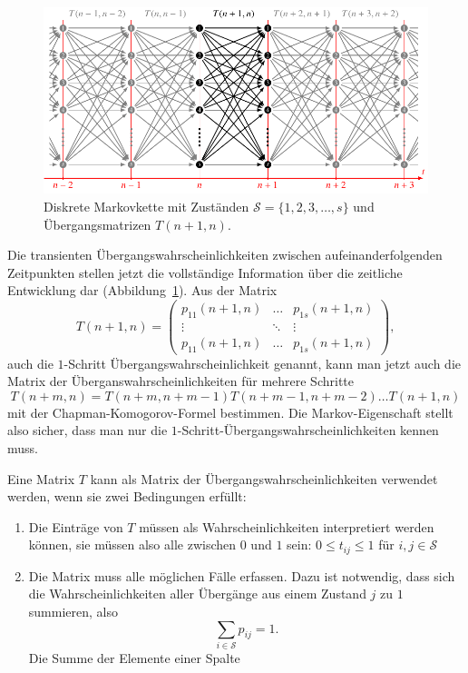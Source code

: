 \begin{figure}
\centering
\includegraphics{chapters/80-wahrscheinlichkeit/images/markov.pdf}
\caption{Diskrete Markovkette mit Zuständen $\mathcal{S}=\{1,2,3,\dots,s\}$
und Übergangsmatrizen $T(n+1,n)$.
\label{buch:wahrscheinlichkeit:fig:diskretemarkovkette}}
\end{figure}

Die transienten Übergangswahrscheinlichkeiten zwischen aufeinanderfolgenden
Zeitpunkten stellen jetzt die vollständige Information über die
zeitliche Entwicklung dar
(Abbildung~\ref{buch:wahrscheinlichkeit:fig:diskretemarkovkette}).
Aus der Matrix
\[
T(n+1,n)
=
\begin{pmatrix}
p_{11}(n+1,n) & \dots  & p_{1s}(n+1,n)\\
\vdots        & \ddots & \vdots       \\
p_{11}(n+1,n) & \dots  & p_{1s}(n+1,n)
\end{pmatrix},
\]
auch die $1$-Schritt Übergangswahrscheinlichkeit genannt, kann man jetzt
auch die Matrix der Überganswahrscheinlichkeiten für mehrere Schritte
\[
T(n+m,n)
=
T(n+m,n+m-1)
T(n+m-1,n+m-2)
\dots
T(n+1,n)
\]
mit der Chapman-Komogorov-Formel bestimmen.
Die Markov-Eigenschaft stellt also sicher, dass man nur die 
$1$-Schritt-Übergangswahrscheinlichkeiten kennen muss.

Eine Matrix $T$ kann als Matrix der Übergangswahrscheinlichkeiten
verwendet werden, wenn sie zwei Bedingungen erfüllt:
\begin{enumerate}
\item Die Einträge von $T$ müssen als Wahrscheinlichkeiten interpretiert
werden können, sie müssen also alle zwischen $0$ und $1$ sein:
$0\le t_{ij}\le 1$ für $i,j\in\mathcal{S}$
\item Die Matrix muss alle möglichen Fälle erfassen.
Dazu ist notwendig, dass sich die Wahrscheinlichkeiten aller Übergänge
aus einem Zustand $j$ zu $1$ summieren, also
\[
\sum_{i\in\mathcal{S}} p_{ij} = 1.
\]
Die Summe der Elemente einer Spalte 
\end{enumerate}

